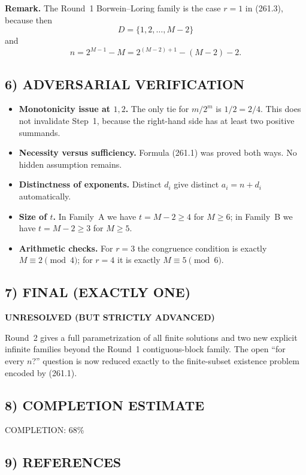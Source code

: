 \medskip
\noindent
\textbf{Remark.}
The Round~1 Borwein--Loring family is the case $r=1$ in (261.3), because then
\[
D=\{1,2,\dots,M-2\}
\]
and
\[
n=2^{M-1}-M=2^{(M-2)+1}-(M-2)-2.
\]

\subsection*{6) ADVERSARIAL VERIFICATION}

\begin{itemize}
\item \textbf{Monotonicity issue at $1,2$.}  The only tie for $m/2^m$ is $1/2=2/4$.  This does not invalidate Step~1, because the right-hand side has at least two positive summands.
\item \textbf{Necessity versus sufficiency.}  Formula (261.1) was proved both ways.  No hidden assumption remains.
\item \textbf{Distinctness of exponents.}  Distinct $d_i$ give distinct $a_i=n+d_i$ automatically.
\item \textbf{Size of $t$.}  In Family~A we have $t=M-2\geq 4$ for $M\geq 6$; in Family~B we have $t=M-2\geq 3$ for $M\geq 5$.
\item \textbf{Arithmetic checks.}  For $r=3$ the congruence condition is exactly $M\equiv 2\pmod 4$; for $r=4$ it is exactly $M\equiv 5\pmod 6$.
\end{itemize}

\subsection*{7) FINAL (EXACTLY ONE)}

\textbf{UNRESOLVED (BUT STRICTLY ADVANCED)}

Round~2 gives a full parametrization of all finite solutions and two new explicit infinite families beyond the Round~1 contiguous-block family.  The open ``for every $n$?'' question is now reduced exactly to the finite-subset existence problem encoded by (261.1).

\subsection*{8) COMPLETION ESTIMATE}

COMPLETION: 68\%

\subsection*{9) REFERENCES}

